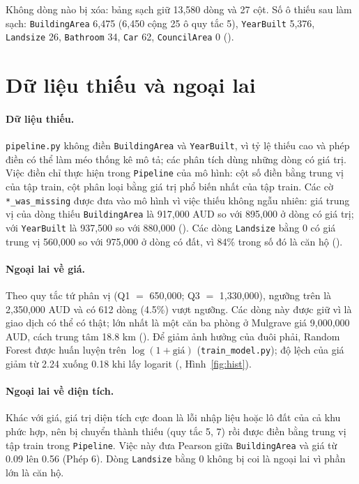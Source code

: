 Không dòng nào bị xóa: bảng sạch giữ 13,580 dòng và 27 cột. Số ô thiếu sau làm sạch: \texttt{BuildingArea} 6,475 (6,450 cộng 25 ô quy tắc 5), \texttt{YearBuilt} 5,376, \texttt{Landsize} 26, \texttt{Bathroom} 34, \texttt{Car} 62, \texttt{CouncilArea} 0 ().

\section{Dữ liệu thiếu và ngoại lai}\label{sec:thieu}
\paragraph{Dữ liệu thiếu.} \texttt{pipeline.py} không điền \texttt{BuildingArea} và \texttt{YearBuilt}, vì tỷ lệ thiếu cao và phép điền có thể làm méo thống kê mô tả; các phân tích dùng những dòng có giá trị. Việc điền chỉ thực hiện trong \texttt{Pipeline} của mô hình: cột số điền bằng trung vị của tập train, cột phân loại bằng giá trị phổ biến nhất của tập train. Các cờ \texttt{*\_was\_missing} được đưa vào mô hình vì việc thiếu không ngẫu nhiên: giá trung vị của dòng thiếu \texttt{BuildingArea} là 917,000 AUD so với 895,000 ở dòng có giá trị; với \texttt{YearBuilt} là 937,500 so với 880,000 (). Các dòng \texttt{Landsize} bằng 0 có giá trung vị 560,000 so với 975,000 ở dòng có đất, vì 84\% trong số đó là căn hộ ().

\paragraph{Ngoại lai về giá.} Theo quy tắc tứ phân vị (Q1 $=$ 650,000; Q3 $=$ 1,330,000), ngưỡng trên là 2,350,000 AUD và có 612 dòng (4.5\%) vượt ngưỡng. Các dòng này được giữ vì là giao dịch có thể có thật; lớn nhất là một căn ba phòng ở Mulgrave giá 9,000,000 AUD, cách trung tâm 18.8 km (). Để giảm ảnh hưởng của đuôi phải, Random Forest được huấn luyện trên $\log(1+\text{giá})$ (\texttt{train\_model.py}); độ lệch của giá giảm từ 2.24 xuống 0.18 khi lấy logarit (, Hình~\ref{fig:hist}).

\paragraph{Ngoại lai về diện tích.} Khác với giá, giá trị diện tích cực đoan là lỗi nhập liệu hoặc lô đất của cả khu phức hợp, nên bị chuyển thành thiếu (quy tắc 5, 7) rồi được điền bằng trung vị tập train trong \texttt{Pipeline}. Việc này đưa Pearson giữa \texttt{BuildingArea} và giá từ 0.09 lên 0.56 (Phép 6). Dòng \texttt{Landsize} bằng 0 không bị coi là ngoại lai vì phần lớn là căn hộ.

